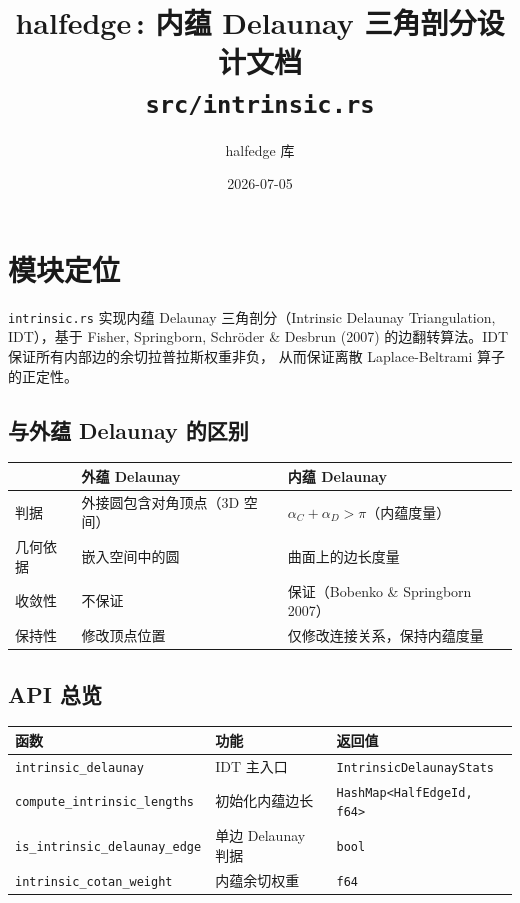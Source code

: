 \documentclass[11pt,a4paper]{article}
\title{\textbf{halfedge\,: 内蕴 Delaunay 三角剖分设计文档} \\ \large \texttt{src/intrinsic.rs}}
\author{halfedge 库}
\date{2026-07-05}
\begin{document}
\maketitle
\tableofcontents

\section{模块定位}

\texttt{intrinsic.rs} 实现内蕴 Delaunay 三角剖分（Intrinsic Delaunay
Triangulation, IDT），基于 Fisher, Springborn, Schröder \& Desbrun (2007)
的边翻转算法。IDT 保证所有内部边的余切拉普拉斯权重非负，
从而保证离散 Laplace-Beltrami 算子的正定性。

\subsection{与外蕴 Delaunay 的区别}

\begin{center}
\renewcommand{\arraystretch}{1.18}
\begin{tabular}{@{}lp{5.5cm}p{5.5cm}@{}}
  \toprule
  & \textbf{外蕴 Delaunay} & \textbf{内蕴 Delaunay} \\
  \midrule
  判据 & 外接圆包含对角顶点（3D 空间） & $\alpha_C + \alpha_D > \pi$（内蕴度量） \\
  几何依据 & 嵌入空间中的圆 & 曲面上的边长度量 \\
  收敛性 & 不保证 & 保证（Bobenko \& Springborn 2007） \\
  保持性 & 修改顶点位置 & 仅修改连接关系，保持内蕴度量 \\
  \bottomrule
\end{tabular}
\end{center}

\subsection{API 总览}

\begin{center}
\renewcommand{\arraystretch}{1.18}
\begin{tabular}{@{}lp{5cm}l@{}}
  \toprule
  \textbf{函数} & \textbf{功能} & \textbf{返回值} \\
  \midrule
  \texttt{intrinsic\_delaunay} & IDT 主入口 & \texttt{IntrinsicDelaunayStats} \\
  \texttt{compute\_intrinsic\_lengths} & 初始化内蕴边长 & \texttt{HashMap<HalfEdgeId, f64>} \\
  \texttt{is\_intrinsic\_delaunay\_edge} & 单边 Delaunay 判据 & \texttt{bool} \\
  \texttt{intrinsic\_cotan\_weight} & 内蕴余切权重 & \texttt{f64} \\
  \bottomrule
\end{tabular}
\end{center}
\end{document}
